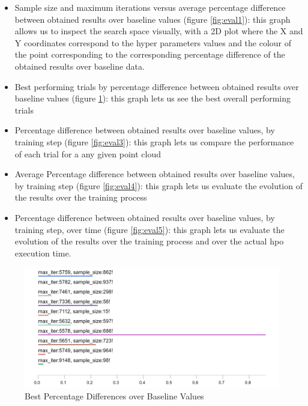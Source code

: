 \begin{itemize}
	\item Sample size and maximum iterations versus average percentage difference between obtained results over baseline values (figure \ref{fig:eval1}): this graph allows us to inspect the search space visually, with a 2D plot where the X and Y coordinates correspond to the hyper parameters values and the colour of the point corresponding to the corresponding percentage difference of the obtained results over baseline data.

	\item Best performing trials by percentage difference between obtained results over baseline values (figure \ref{fig:eval2}): this graph lets us see the best overall performing trials

	\item Percentage difference between obtained results over baseline values, by training step (figure \ref{fig:eval3}): this graph lets us compare the performance of each trial for a any given point cloud

	\item Average Percentage difference between obtained results over baseline values, by training step (figure \ref{fig:eval4}): this graph lets us evaluate the evolution of the results over the training process

	\item Percentage difference between obtained results over baseline values, by training step, over time (figure \ref{fig:eval5}): this graph lets us evaluate the evolution of the results over the training process and over the actual \acrshort{hpo} execution time.
\end{itemize}
	
	\begin{figure}[H]
	\centering
	\includegraphics[width=\textwidth, keepaspectratio]{images/best_results.png}
	\caption{Best Percentage Differences over Baseline Values}
	\label{fig:eval2}
	\end{figure}

